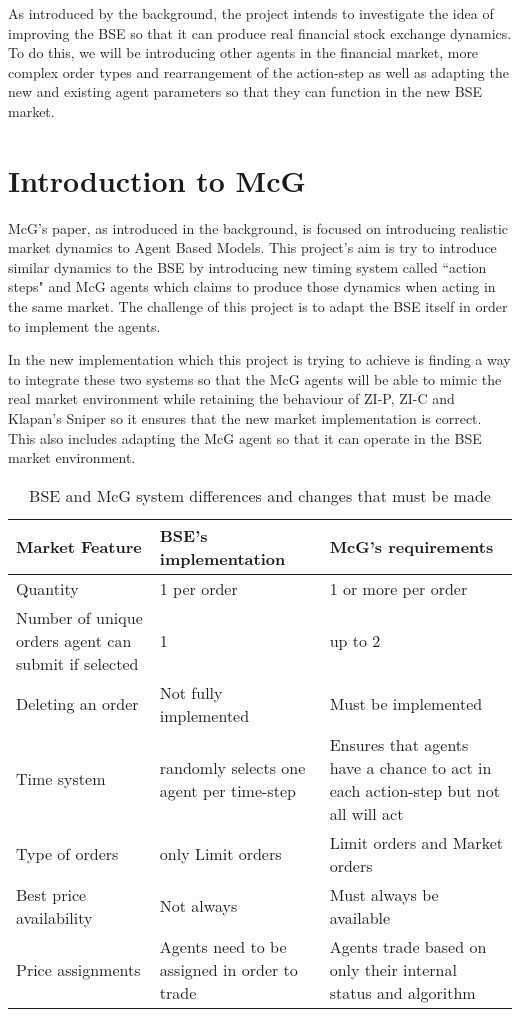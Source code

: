 As introduced by the background, the project intends to investigate the idea of improving the BSE so that it can produce real financial stock exchange dynamics. To do this, we will be introducing other agents in the financial market, more complex order types and rearrangement of the action-step as well as adapting the new and existing agent parameters so that they can function in the new BSE market. 

\section{Introduction to McG}
McG's paper, as introduced in the background, is focused on introducing realistic market dynamics to Agent Based Models. This project's aim is try to introduce similar dynamics to the BSE by introducing new timing system called ``action steps" and McG agents which claims to produce those dynamics when acting in the same market. The challenge of this project is to adapt the BSE itself in order to implement the agents. 

In the new implementation which this project is trying to achieve is finding a way to integrate these two systems so that the McG agents will be able to mimic the real market environment while retaining the behaviour of ZI-P, ZI-C and Klapan's Sniper so it ensures that the new market implementation is correct. This also includes adapting the McG agent so that it can operate in the BSE market environment. 

\begin{table}[h]
\centering
\begin{tabular}{ |p{4cm}||p{4cm}|p{4cm}|} 
\hline
\textbf{Market Feature}& \textbf{BSE's implementation} & \textbf{McG's requirements} \\
\hline
\hline
Quantity & 1 per order & 1 or more per order \\ 
\hline
Number of unique orders agent can submit if selected & 1 & up to 2\\ 
\hline
Deleting an order & Not fully implemented & Must be implemented \\ 
\hline
Time system & randomly selects one agent per time-step & Ensures that agents have a chance to act in each action-step but not all will act\\ 
\hline
Type of orders & only Limit orders & Limit orders and Market orders \\
\hline
Best price availability & Not always & Must always be available \\
\hline
Price assignments & Agents need to be assigned in order to trade & Agents trade based on only their internal status and algorithm \\
\hline
\end{tabular}
\caption{BSE and McG system differences and changes that must be made}  
\end{table}
\FloatBarrier

